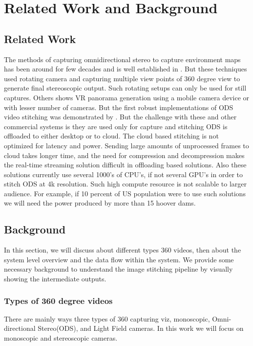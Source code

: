 \chapter{Related Work and Background}

\section{Related Work}
The methods of capturing omnidirectional stereo to capture environment maps has been around for few decades and is well established in \cite{peleg2001omnistereo, kang2000geometry, ishiguro1990omni}. But these techniques used rotating camera and capturing multiple view points of 360 degree view to generate final stereoscopic output. Such rotating setups can only be used for still captures. Others \cite{richardt2013megastereo,ho2017dual} shows VR panorama generation using a mobile camera device or with lesser number of cameras. But the first robust implementations of ODS  video stitching was demonstrated by \cite{richardt2017video,fbSurround360}. But the challenge with these and other commercial systems is they are used only for capture and stitching ODS is offloaded to either desktop or to cloud. The cloud based stitching is not optimized for latency and power. Sending large amounts of unprocessed frames to cloud takes longer time, and the need for compression and decompression makes the real-time streaming solution difficult in offloading based solutions. Also these solutions currently use several 1000's of CPU's, if not several GPU's in order to stitch ODS at 4k resolution. Such high compute resource is not scalable to larger audience. For example, if 10 percent of US population were to use such solutions we will need the power produced by more than 15 hoover dams. 

\section{Background}
In this section, we will discuss about different types 360 videos, then about the system level overview and the data flow within the system. We provide some necessary background to understand the image stitching pipeline by visually showing the intermediate outputs. 

\subsection{Types of 360 degree videos}
There are mainly ways three types of 360 capturing viz, monoscopic, Omni-directional Stereo(ODS), and Light Field cameras. In this work we will focus on monoscopic and stereoscopic cameras. 
